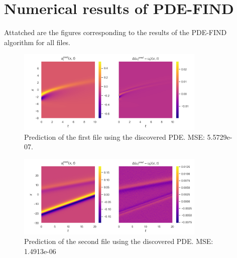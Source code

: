 \documentclass[unicode,11pt,a4paper,oneside,numbers=endperiod,openany]{scrartcl}
\begin{document}
\section{Numerical results of PDE-FIND}\label{app:resultsall}
Attatched are the figures corresponding to the results of the PDE-FIND algorithm for
all files.

\begin{figure}[h!]\label{fig:results1}
    \centering
    \includegraphics[width=0.8\textwidth]{../Task2/figures/results_1.png}
    \caption{Prediction of the first file using the discovered PDE.
    MSE: 5.5729e-07.
    }
\end{figure}

\begin{figure}[h!]\label{fig:results2}
    \centering
    \includegraphics[width=0.8\textwidth]{../Task2/figures/results_2.png}
    \caption{Prediction of the second file using the discovered PDE. MSE: 1.4913e-06
    }
\end{figure}
\end{document}
